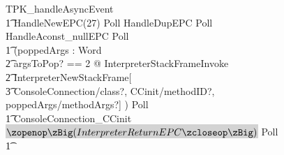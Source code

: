 \begin{figure}[tp!]
  \centering
  \setlength{\zedtab}{0.4cm}
  \setlength{\zedindent}{0pt}
  \setlength{\zedleftsep}{0pt}
  \setlength{\abovedisplayskip}{0pt}
  \setlength{\belowdisplayskip}{0pt}
  \setlength{\abovedisplayshortskip}{0pt}
  \setlength{\belowdisplayshortskip}{0pt}
  \begin{circusaction}
    TPK\_handleAsyncEvent \circdef \\
    \t1 HandleNewEPC(27) \circseq Poll \circseq HandleDupEPC \circseq Poll \circseq  HandleAconst\_nullEPC \circseq Poll \circseq \\
    \t1 (\circvar poppedArgs : \seq Word \circspot \\
    \t2 \lschexpract \exists argsToPop? == 2 @ InterpreterStackFrameInvoke \rschexpract \circseq \\
    \t2 \lschexpract InterpreterNewStackFrame[\\
    \t3 ConsoleConnection/class?, CCinit/methodID?, poppedArgs/methodArgs?] \rschexpract) \circseq Poll \circseq \\
    \t1 ConsoleConnection\_CCinit \circseq \colorbox{lightgray}{$\lschexpract InterpreterReturnEPC \rschexpract$} \circseq Poll \circseq \\
    \t1 {} \cdots {} \\

\end{circusaction}
\end{figure}

